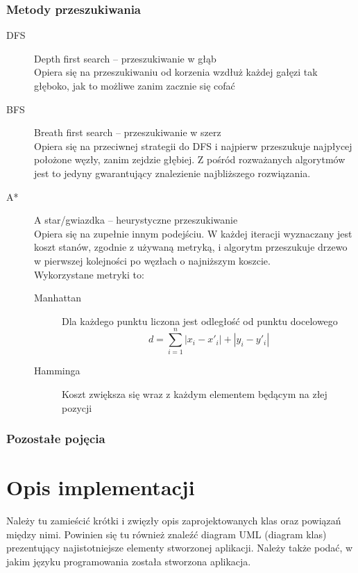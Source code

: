 \documentclass{classrep}
\begin{document}
\subsubsection{Metody przeszukiwania}
\begin{description}
    \item [DFS] Depth first search -- przeszukiwanie w głąb\\ 
    Opiera się na przeszukiwaniu od korzenia wzdłuż każdej gałęzi tak głęboko, jak to możliwe zanim zacznie się cofać
    \item [BFS] Breath first search -- przeszukiwanie w szerz\\
    Opiera się na przeciwnej strategii do DFS i najpierw przeszukuje najpłycej położone węzły, zanim zejdzie głębiej.
    Z pośród rozważanych algorytmów jest to jedyny gwarantujący znalezienie najbliższego rozwiązania.
    \item [A*]  A star/gwiazdka -- heurystyczne przeszukiwanie\\
    Opiera się na zupełnie innym podejściu.
    W każdej iteracji wyznaczany jest koszt stanów, zgodnie z używaną metryką, i algorytm przeszukuje drzewo w pierwszej kolejności po węzłach o najniższym koszcie.
    \\
    Wykorzystane metryki to:
    \begin{description}
        \item [Manhattan] Dla każdego punktu liczona jest odległość od punktu docelowego
        \[d=\sum_{i=1}^{n} |x_i-x'_i|+|y_i-y'_i|\] 
        \item [Hamminga] Koszt zwiększa się wraz z każdym elementem będącym na złej pozycji
    \end{description}
\end{description}

\subsubsection{Pozostałe pojęcia}
\begin{description}
    \item [Cykl]
    \item [Droga]
    \item 
\end{description}

\section{Opis implementacji}
{\color{blue}
Należy tu zamieścić krótki i zwięzły opis zaprojektowanych klas oraz powiązań
między nimi. Powinien się tu również znaleźć diagram UML (diagram klas)
prezentujący najistotniejsze elementy stworzonej aplikacji. Należy także podać,
w jakim języku programowania została stworzona aplikacja.}
\end{document}
